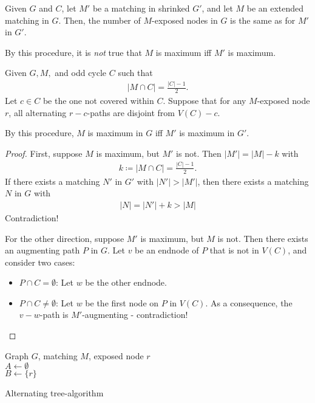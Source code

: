Given $G$ and $C$, let $M'$ be a matching in shrinked $G'$, and let $M$ be an extended
matching in $G$. Then, the number of $M$-exposed nodes in $G$ is the same as for $M'$ in $G'$.
\begin{warning}
    By this procedure, it is \emph{not} true that $M$ is maximum iff $M'$ is maximum.
\end{warning}

Given $G,M,$ and odd cycle $C$ such that
\begin{align*}
    |M \cap C| = \frac{|C|-1}{2}.
\end{align*}
Let $c \in C$ be the one not covered within $C$. Suppose that for any $M$-exposed
node $r$, all alternating $r-c$-paths are disjoint from $V(C)-c$.
\begin{theorem}
    By this procedure, $M$ is maximum in $G$ iff $M'$ is maximum in $G'$.
\end{theorem}
\begin{proof}
    First, suppose $M$ is maximum, but $M'$ is not. Then $|M'|=|M|-k$ with
    \begin{align*}
        k \coloneqq |M \cap C| = \frac{|C|-1}{2}.
    \end{align*}
    If there exists a matching $N'$ in $G'$ with $|N'|>|M'|$, then there exists a matching $N$ in $G$
    with
    \begin{align*}
        |N| = |N'|+k > |M|
    \end{align*}
    Contradiction!

    For the other direction, suppose $M'$ is maximum, but $M$ is not.
    Then there exists an augmenting path $P$ in $G$.
    Let $v$ be an endnode of $P$ that is not in $V(C)$, and consider two cases:
    \begin{itemize}
        \item $P \cap C = \emptyset$: Let $w$ be the other endnode.
        \item $P \cap C \neq \emptyset$: Let $w$ be the first node on $P$ in $V(C)$.
              As a consequence, the $v-w$-path is $M'$-augmenting - contradiction!
    \end{itemize}
\end{proof}
\begin{algorithm}[H] \label{algo:alt_tree}
    \SetAlgoLined
    Graph $G$, matching $M$, exposed node $r$\\
    $A \leftarrow \emptyset$\\
    $B \leftarrow \{r\}$\\
    \caption{Alternating tree-algorithm}
\end{algorithm} \noindent
